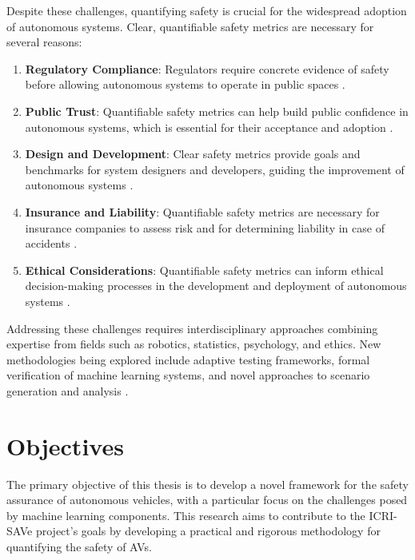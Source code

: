 Despite these challenges, quantifying safety is crucial for the widespread adoption of autonomous systems. Clear, quantifiable safety metrics are necessary for several reasons:

\begin{enumerate}
    \item \textbf{Regulatory Compliance}: Regulators require concrete evidence of safety before allowing autonomous systems to operate in public spaces \cite{Cummings2021}.
    
    \item \textbf{Public Trust}: Quantifiable safety metrics can help build public confidence in autonomous systems, which is essential for their acceptance and adoption \cite{Choi2020}.
    
    \item \textbf{Design and Development}: Clear safety metrics provide goals and benchmarks for system designers and developers, guiding the improvement of autonomous systems \cite{Shalev2017}.
    
    \item \textbf{Insurance and Liability}: Quantifiable safety metrics are necessary for insurance companies to assess risk and for determining liability in case of accidents \cite{Schellekens2015}.
    
    \item \textbf{Ethical Considerations}: Quantifiable safety metrics can inform ethical decision-making processes in the development and deployment of autonomous systems \cite{Awad2018}.
\end{enumerate}

Addressing these challenges requires interdisciplinary approaches combining expertise from fields such as robotics, statistics, psychology, and ethics. New methodologies being explored include adaptive testing frameworks, formal verification of machine learning systems, and novel approaches to scenario generation and analysis \cite{Seshia2016}.

\section{Objectives}

The primary objective of this thesis is to develop a novel framework for the safety assurance of autonomous vehicles, with a particular focus on the challenges posed by machine learning components. This research aims to contribute to the ICRI-SAVe project's goals by developing a practical and rigorous methodology for quantifying the safety of AVs.

